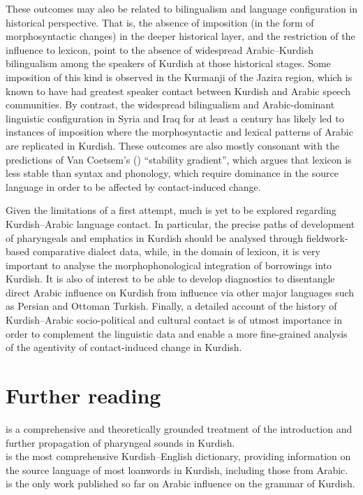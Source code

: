 \documentclass[output=paper]{langsci/langscibook}
\begin{document}
These outcomes may also be related to bilingualism and language configuration in historical perspective. That is, the absence of imposition (in the form of morphosyntactic changes) in the deeper historical layer, and the restriction of the influence to lexicon, point to the absence of widespread Arabic–Kurdish bilingualism among the speakers of Kurdish at those historical stages. Some imposition of this kind is observed in the Kurmanji of the Jazira region, which is known to have had greatest speaker contact between Kurdish and Arabic speech communities. By contrast, the widespread bilingualism and Arabic-dominant linguistic configuration in Syria and Iraq for at least a century has likely led to instances of imposition where the morphosyntactic and lexical patterns of Arabic are replicated in Kurdish. These outcomes are also mostly consonant with the predictions of Van Coetsem’s (\citeyear{VanCoetsem1988,VanCoetsem2000}) “stability gradient”, which argues that lexicon is less stable than syntax and phonology, which require dominance in the source language in order to be affected by contact-induced change.    

Given the limitations of a first attempt, much is yet to be explored regarding Kurdish–Arabic language contact. In particular, the precise paths of development of pharyngeals and emphatics in Kurdish should be analysed through fieldwork-based comparative dialect data, while, in the domain of lexicon, it is very important to analyse the morphophonological integration of borrowings into Kurdish. It is also of interest to be able to develop diagnostics to disentangle direct Arabic influence on Kurdish from influence via other major languages such as Persian and Ottoman Turkish. Finally, a detailed account of the history of Kurdish–Arabic socio-political and cultural contact is of utmost importance in order to complement the linguistic data and enable a more fine-grained analysis of the agentivity of contact-induced change in Kurdish.      

\section*{Further reading}
\citet{Barryforthcoming} is a comprehensive and theoretically grounded treatment of the introduction and further propagation of pharyngeal sounds in Kurdish.\\ 
\citet{Chyet2003} is the most comprehensive Kurdish–English dictionary,  providing information on the source language of most loanwords in Kurdish, including those from Arabic.\\
\citet{Tsabolov1994} is the only work published so far on Arabic influence on the grammar of Kurdish. 
\end{document}
